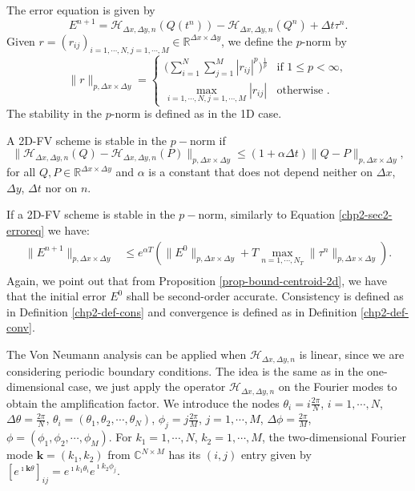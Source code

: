 The error equation is given by
\begin{equation}
	E^{n+1} = \mathcal{H}_{\Delta x ,\Delta y,n}(Q(t^n)) - \mathcal{H}_{\Delta x ,\Delta y,n}(Q^n) +  \Delta t \tau^n.
\end{equation}
Given $r = (r_{ij})_{i=1,\cdots,N,j=1,\cdots,M}\in \mathbb{R}^{\Delta x \times \Delta y}$, we define the $p$-norm by
\begin{equation}
	\label{chp3-pnorm}
	\|r\|_{p,\Delta x \times \Delta y}=
	\begin{cases}
		\bigg( \sum_{i=1}^{N} \sum_{j=1}^{M}|r_{ij}|^p \bigg)^{\frac{1}{p}} & \text{if } 1\leq p < \infty,\\
		\max_{i=1, \cdots, N,j=1,\cdots,M}{|r_{ij}|} & \text{otherwise }.
	\end{cases}
\end{equation}
The stability in the $p$-norm is defined as in the 1D case.
\begin{definition}
	A 2D-FV scheme is stable in the $p-$norm if 
	\begin{equation}
		\|\mathcal{H}_{\Delta x ,\Delta y,n}(Q) - \mathcal{H}_{\Delta x ,\Delta y,n}(P)\|_{p,\Delta x \times \Delta y} \leq (1+\alpha \Delta t)  \|Q-P\|_{p,\Delta x \times \Delta y},
	\end{equation}
	for all $Q, P \in \mathbb{R}^{\Delta x \times \Delta y}$ and $\alpha$ is a constant
	that does not depend neither on $\Delta x$, $\Delta y$, $\Delta t$ nor on $n$.
\end{definition}
If a 2D-FV scheme is stable in the $p-$norm, similarly to Equation \eqref{chp2-sec2-erroreq} we have:
\begin{align*}
		\|E^{n+1}\|_{p,\Delta x \times \Delta y} &\leq e^{\alpha T}(\|E^0\|_{p,\Delta x \times \Delta y} + T\max_{n=1, \cdots, N_T}\|\tau^n\|_{p,\Delta x \times \Delta y}).\\
\end{align*}
Again, we point out that from Proposition \ref{prop-bound-centroid-2d}, we have that the initial error $E^0$ shall be second-order accurate.
Consistency is defined as in Definition \ref{chp2-def-cons} and convergence is defined as in Definition \ref{chp2-def-conv}.

The Von Neumann analysis can be applied when $\mathcal{H}_{\Delta x ,\Delta y,n}$ is linear, since we are considering periodic boundary conditions.
The idea is the same as in the one-dimensional case, we just apply the operator $\mathcal{H}_{\Delta x ,\Delta y,n}$ on the Fourier modes to obtain
the amplification factor.
We introduce the nodes $\theta_i = i\frac{2\pi}{N}$, $i=1, \cdots, N$, $\Delta \theta = \frac{2\pi}{N}$,
$\theta_i = (\theta_1, \theta_2, \cdots, \theta_N)$, $\phi_j = j\frac{2\pi}{M}$, $j=1, \cdots, M$, $\Delta \phi = \frac{2\pi}{M}$,
$\phi = (\phi_1, \phi_2, \cdots, \phi_M)$.
For $k_1=1, \cdots, N$, $k_2=1, \cdots, M$, the two-dimensional Fourier mode $\boldsymbol{k} = (k_1,k_2)$ from $\mathbb{C}^{N\times M}$ 
has its $(i,j)$ entry given by $[e^{\imath \boldsymbol{k} \theta}]_{ij} = e^{\imath k_1 \theta_i}e^{\imath k_2 \phi_j}$. 

